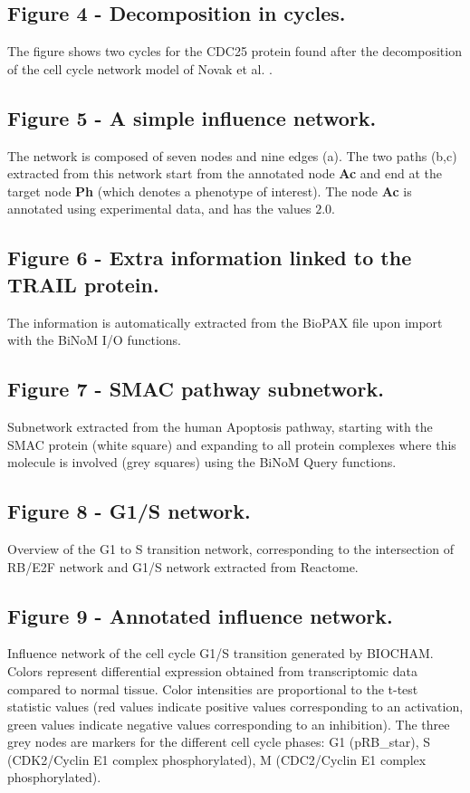 \documentclass[10pt]{bmc_article}
\newenvironment{bmcformat}{\baselineskip20pt\sloppy\setboolean{publ}{false}}{\baselineskip20pt\sloppy}
\begin{document}
\begin{bmcformat}
  \subsection*{Figure 4 - Decomposition in cycles.}
The figure shows two cycles for the CDC25 protein found after the decomposition of the cell cycle network model of Novak et al. \cite{novak1998model}.

  \subsection*{Figure 5 - A simple influence network.}
The network is composed of seven nodes and nine edges (a). The two paths (b,c)
extracted from this network start from the annotated node \textbf{Ac} and end at
the target node \textbf{Ph} (which denotes a phenotype of interest). The node
\textbf{Ac} is annotated using experimental data, and has the
values $2.0$.

  \subsection*{Figure 6 - Extra information linked to the TRAIL protein.}
The information is automatically extracted from the BioPAX file upon
import with the BiNoM I/O functions.

  \subsection*{Figure 7 - SMAC pathway subnetwork.}
Subnetwork extracted from the human Apoptosis pathway, starting with the
SMAC protein (white square) and expanding to all protein complexes where this
molecule is involved (grey squares) using the BiNoM Query functions.

  \subsection*{Figure 8 - G1/S network.}
Overview of the G1 to S transition network, corresponding to the intersection of
RB/E2F network and G1/S network extracted from Reactome.

  \subsection*{Figure 9 - Annotated influence network.}
Influence network of the cell cycle G1/S transition generated by BIOCHAM. Colors represent differential
expression obtained from transcriptomic data compared to normal tissue. Color
intensities are proportional to the t-test statistic values (red values indicate
positive values corresponding to an activation, green values indicate negative
values corresponding to an inhibition). The three grey nodes are markers for the
different cell cycle phases: G1 (pRB\_star), S (CDK2/Cyclin E1 complex phosphorylated), M (CDC2/Cyclin E1 complex phosphorylated).


\end{bmcformat}
\end{document}
